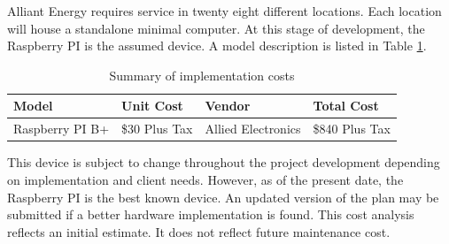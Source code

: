 Alliant Energy requires service in twenty eight different locations. Each location will house a standalone minimal computer. At this stage of development, the Raspberry PI is the assumed device. A model description is listed in Table \ref{table:cost}.

\vspace{0.5cm}
\begin{table}[h]
\centering
\begin{tabular}{l l l l}
Model & Unit Cost & Vendor & Total Cost \\
\hline
Raspberry PI B+ & \$30 Plus Tax & Allied Electronics & \$840 Plus Tax \\
\end{tabular}
\caption{Summary of implementation costs}
\label{table:cost}
\end{table}
\vspace{0.5cm}

This device is subject to change throughout the project development depending on implementation and client needs. However, as of the present date, the Raspberry PI is the best known device. An updated version of the plan may be submitted if a better hardware implementation is found. This cost analysis reflects an initial estimate. It does not reflect future maintenance cost.
